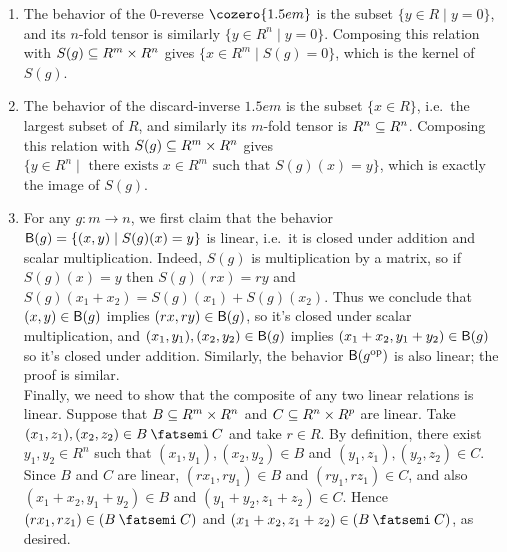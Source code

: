 \documentclass[7Sketches]{subfiles}
\begin{document}
{\begin{enumerate}
\end{enumerate}
}{
\begin{enumerate}
	\item The behavior of the 0-reverse $\cozero{1.5em}$ is the subset $\{y\in R\mid y=0\}$, and its $n$-fold tensor is similarly $\{y\in R^n\mid y=0\}$. Composing this relation with $S(g)\ss R^m\times R^n$ gives $\{x\in R^m\mid S(g)=0\}$, which is the kernel of $S(g)$.
	\item The behavior of the discard-inverse $\unit{1.5em}$ is the subset $\{x\in R\}$, i.e.\ the largest subset of $R$, and similarly its $m$-fold tensor is $R^n\ss R^n$. Composing this relation with $S(g)\ss R^m\times R^n$ gives $\{y\in R^n\mid \text{ there exists }x\in R^m\text{ such that }S(g)(x)=y\}$, which is exactly the image of $S(g)$.
	\item For any $g\colon m\to n$, we first claim that the behavior $\beh(g)=\{(x,y)\mid S(g)(x)=y\}$ is linear, i.e.\ it is closed under addition and scalar multiplication. Indeed, $S(g)$ is multiplication by a matrix, so if $S(g)(x)=y$ then $S(g)(rx)=ry$ and $S(g)(x_1+x_2)=S(g)(x_1)+S(g)(x_2)$. Thus we conclude that $(x,y)\in\beh(g)$ implies $(rx,ry)\in\beh(g)$, so it's closed under scalar multiplication, and $(x_1,y_1),(x_2,y_2)\in\beh(g)$ implies $(x_1+x_2,y_1+y_2)\in\beh(g)$ so it's closed under addition. Similarly, the behavior $\beh(g\op)$ is also linear; the proof is similar.\\
	
	Finally, we need to show that the composite of any two linear relations is linear. Suppose that $B\ss R^m\times R^n$ and $C\ss R^n\times R^p$ are linear. Take $(x_1,z_1),(x_2,z_2)\in B\cp C$ and take $r\in R$. By definition, there exist $y_1,y_2\in R^n$ such that $(x_1,y_1),(x_2,y_2)\in B$ and $(y_1,z_1),(y_2,z_2)\in C$. Since $B$ and $C$ are linear, $(rx_1,ry_1)\in B$ and $(ry_1,rz_1)\in C$, and also $(x_1+x_2,y_1+y_2)\in B$ and $(y_1+y_2,z_1+z_2)\in C$. Hence $(rx_1,rz_1)\in (B\cp C)$ and $(x_1+x_2,z_1+z_2)\in (B\cp C)$, as desired.
\end{enumerate}
}
\end{document}
